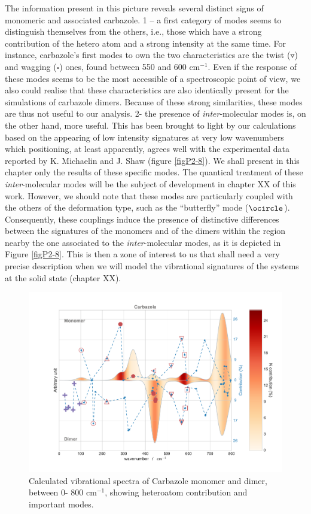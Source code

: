 	The information present in this picture reveals several distinct signs of monomeric and associated carbazole. 1 – a first category of modes seems to distinguish themselves from the others, i.e., those which have a strong contribution of the hetero atom and a strong intensity at the same time. For instance, carbazole’s first modes to own the two characteristics are the twist ($\triangledown$) and wagging ($\square$) ones, found between 550 and 600 cm$^{-1}$. Even if the response of these modes seems to be the most accessible of a spectroscopic point of view, we also could realise that these characteristics are also identically present for the simulations of carbazole dimers. Because of these strong similarities, these modes are thus not useful to our analysis. 2- the presence of \textit{inter}-molecular modes is, on the other hand, more useful. This has been brought to light by our calculations based on the appearing of low intensity signatures at very low wavenumbers which positioning, at least apparently, agrees well with the experimental data reported by K. Michaelin and J. Shaw (figure \ref{figP2-8}). We shall present in this chapter only the results of these specific modes. The quantical treatment of these \textit{inter}-molecular modes will be the subject of development in chapter XX of this work. However, we should note that these modes are particularly coupled with the others of the deformation type, such as the “butterfly” mode ($\ocircle$). 
	 Consequently, these couplings induce the presence of distinctive differences between the signatures of the monomers and of the dimers within the region nearby the one associated to the \textit{inter}-molecular modes, as it is depicted in Figure \ref{figP2-8}. This is then a zone of interest to us that shall need a very precise description when we will model the vibrational signatures of the systems at the solid state (chapter XX).
	 
	 
	 	\begin{figure}[H]
	 		\begin{center}
	 			\includegraphics[scale=0.5]{image/P2-7}
	 		\end{center}
	 		\caption{Calculated vibrational spectra of Carbazole monomer and dimer, between 0- 800 cm$^{-1}$, showing heteroatom contribution and important modes.}  \label{figP2-7}
	 	\end{figure}
	 	
